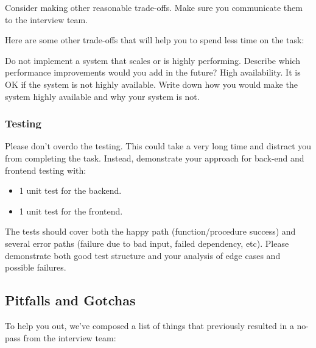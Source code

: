 \documentclass{article}
\begin{document}
Consider making other reasonable trade-offs. Make sure you communicate them to the interview team.

Here are some other trade-offs that will help you to spend less time on the task:

Do not implement a system that scales or is highly performing. Describe which performance improvements would you add in the future?
High availability. It is OK if the system is not highly available. Write down how you would make the system highly available and why your system is not.

\subsubsection*{Testing}

Please don’t overdo the testing. This could take a very long time and distract you from completing the task. Instead, demonstrate your approach for back-end and frontend testing with:

  \begin{itemize}
  \item 1 unit test for the backend.
  \item 1 unit test for the frontend.
  \end{itemize}

The tests should cover both the happy path (function/procedure success) and several error paths (failure due to bad input, failed dependency, etc). Please demonstrate both good test structure and your analysis of edge cases and possible failures.

\subsection{Pitfalls and Gotchas}
    
  To help you out, we've composed a list of things that previously resulted in a no-pass from the interview team:
\end{document}
